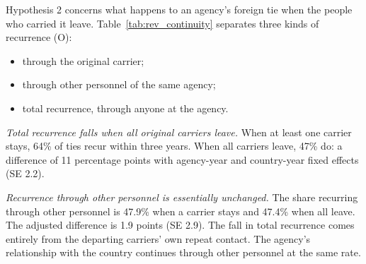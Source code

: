 \documentclass[11pt]{article}
\begin{document}
\begin{table}[t]
\centering\footnotesize\setlength{\tabcolsep}{5pt}
\caption{Recurrence of agency-country ties after the original carriers leave (O). Unit: an agency-country tie observed in year $t$ through linked recipients. Recurrence: the country gives to the agency again in $t+1$ to $t+3$. Panel A shows shares; Panel B shows linear probability models with agency-by-year and country-by-year fixed effects and log number of carriers, with standard errors clustered by agency. When all carriers leave, recurrence through the original carrier is zero by construction. The ties come from 27 agencies, 21 of which remain after singleton groups are dropped.}\label{tab:rev_continuity}

\end{table}

Hypothesis 2 concerns what happens to an agency's foreign tie when the people who carried it leave. Table~\ref{tab:rev_continuity} separates three kinds of recurrence (O):
\begin{itemize}
\item through the original carrier;
\item through other personnel of the same agency;
\item total recurrence, through anyone at the agency.
\end{itemize}

\emph{Total recurrence falls when all original carriers leave.} When at least one carrier stays, 64\% of ties recur within three years. When all carriers leave, 47\% do: a difference of 11 percentage points with agency-year and country-year fixed effects (SE 2.2).

\emph{Recurrence through other personnel is essentially unchanged.} The share recurring through other personnel is 47.9\% when a carrier stays and 47.4\% when all leave. The adjusted difference is 1.9 points (SE 2.9). The fall in total recurrence comes entirely from the departing carriers' own repeat contact. The agency's relationship with the country continues through other personnel at the same rate.

\begin{table}[t]
\centering\footnotesize\setlength{\tabcolsep}{4pt}
\caption{Do foreign contacts follow the person? Episodes in which a linked recipient is observed under agency A and later under agency B. Row 1: the share of the mover's gifts at B that come from countries that gave to them at A, against the same share among B's other recipients in the same years. Row 2: the same for specific foreign individuals. Row 3: at A, the share of other recipients' gifts from the mover's countries in the three years after the move against the three years before. $p$-values from 5,000 sign-flip permutations.}\label{tab:rev_movers}

\end{table}
\end{document}
